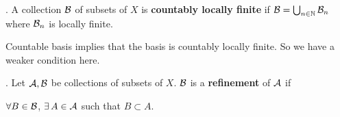 .  A collection \(\mathcal{B}\) of subsets of \(X\) is \textbf{countably locally finite} if \(\mathcal{B} = \bigcup_{n\in \mathbb{N}} \mathcal{B}_n\) where \(\mathcal{B}_n\) is locally finite.

\rmk Countable basis implies that the basis is countably locally finite. So we have a weaker condition here.

.  Let \(\mathcal{A}, \mathcal{B}\) be collections of subsets of \(X\). \(\mathcal{B}\) is a \textbf{refinement} of \(\mathcal{A}\) if
\begin{center}
    \(\forall B \in \mathcal{B}\), \(\exists A \in \mc{A}\) such that \(B \subset A\).
\end{center}

\pagebreak
